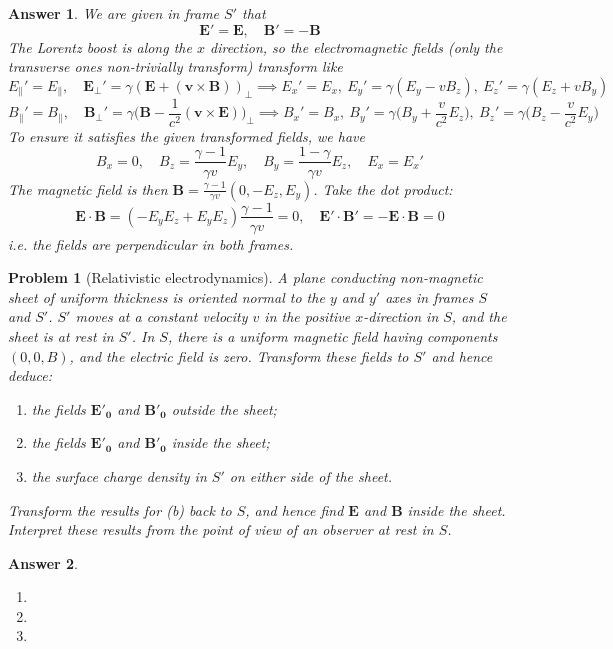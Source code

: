 \documentclass[a4paper]{article}
\newtheorem{ans}{Answer}
\theoremstyle{new}
\newtheorem{qns}{Problem}
\begin{document}
\begin{ans}
We are given in frame $S'$ that
$$\mathbf{E'}=\mathbf{E},\quad\mathbf{B'}=-\mathbf{B}$$
The Lorentz boost is along the $x$ direction, so the electromagnetic fields (only the transverse ones non-trivially transform) transform like
$$E_\parallel'=E_\parallel,\quad \mathbf{E_\perp'}=\gamma(\mathbf{E}+(\mathbf{v}\times\mathbf{B}))_\perp\implies E_x'=E_x,~E_y'=\gamma(E_y-vB_z),~E_z'=\gamma(E_z+vB_y)$$
$$B_\parallel'=B_\parallel,\quad \mathbf{B_\perp'}=\gamma\bigg(\mathbf{B}-\frac{1}{c^2}(\mathbf{v}\times\mathbf{E})\bigg)_\perp\implies B_x'=B_x,~B_y'=\gamma\bigg(B_y+\frac{v}{c^2}E_z\bigg),~B_z'=\gamma(B_z-\frac{v}{c^2}E_y\bigg)$$
To ensure it satisfies the given transformed fields, we have
$$B_x=0,\quad B_z=\frac{\gamma-1}{\gamma v}E_y,\quad B_y=\frac{1-\gamma}{\gamma v}E_z,\quad E_x=E_x'$$
The magnetic field is then $\mathbf{B}=\frac{\gamma-1}{\gamma v}(0,-E_z,E_y)$. Take the dot product:
$$\mathbf{E}\cdot\mathbf{B}=(-E_yE_z+E_yE_z)\frac{\gamma-1}{\gamma v}=0,\quad\mathbf{E'}\cdot\mathbf{B'}=-\mathbf{E}\cdot\mathbf{B}=0$$
i.e. the fields are perpendicular in both frames.
\end{ans}
\newpage
\begin{qns}[Relativistic electrodynamics]
A plane conducting non-magnetic sheet of uniform thickness is oriented normal to the $y$ and $y'$ axes in frames $S$ and $S'$. $S'$ moves at a constant velocity $v$ in the positive $x$-direction in $S$, and the sheet is at rest in $S'$. In $S$, there is a uniform magnetic field having components $(0, 0, B)$, and the electric field is zero. Transform these fields to $S'$ and hence deduce:
\begin{enumerate}[label=(\alph*)]
\item the fields $\mathbf{E'_0}$ and $\mathbf{B'_0}$ outside the sheet;
\item the fields $\mathbf{E'_0}$ and $\mathbf{B'_0}$ inside the sheet;
\item the surface charge density in $S'$ on either side of the sheet.
\end{enumerate}
Transform the results for (b) back to $S$, and hence find $\mathbf{E}$ and $\mathbf{B}$ inside the sheet. Interpret these results from the point of view of an observer at rest in $S$.
\end{qns}
\begin{ans}\leavevmode
\begin{enumerate}[label=(\alph*)]
\item 

\item 

\item
\end{enumerate}
\end{ans}
\newpage
\end{document}
